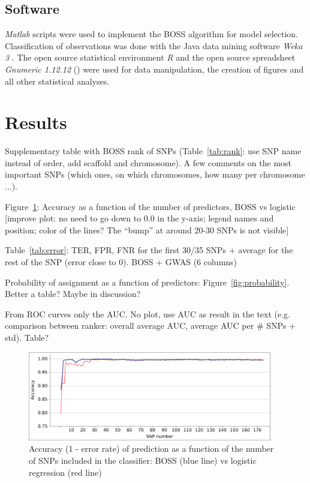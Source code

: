 \subsection{Software}
\label{sec:software}
\emph{Matlab} scripts \cite{MATLAB2010} were used to implement the BOSS
algorithm for model selection. Classification of observations was done
with the Java data mining software \emph{Weka 3} \cite{hall2009weka}.
The open source statistical environment \emph{R} \cite{r2008manual} and
the open source spreadsheet \emph{Gnumeric 1.12.12}
(\cite{gnumeric2014}) were used for data manipulation, the creation of
figures and all other statistical analyses.

\section{Results}
\label{sec:results}
Supplementary table with BOSS rank of SNPs (Table~\ref{tab:rank}: use
SNP name instead of order, add scaffold and chromosome). A few comments on the most
important SNPs (which ones, on which chromosomes, how many per
chromosome ...).

Figure~\ref{fig:accuracy}: Accuracy as a function of the number of
predictors, BOSS vs logistic [improve plot: no need to go down to 0.0 in
the y-axis; legend names and position; color of the lines? The ``bump''
at around 20-30 SNPs is not visible]

Table~\ref{tab:error}: TER, FPR, FNR for the first 30/35 SNPs + average for the
rest of the SNP (error close to $0$). BOSS + GWAS (6 columns)


Probability of assignment as a function of predictors:
Figure~\ref{fig:probability}. Better a table? Maybe in discussion?

From ROC curves only the AUC. No plot, use AUC as result in the text (e.g.
comparison between ranker: overall average AUC, average AUC per \# SNPs
+ std). Table?

\begin{figure}
\includegraphics[width=0.95\textwidth]{accuracy.pdf}
\caption{Accuracy (1 - error rate) of prediction as a function of the
  number of SNPs included in the classifier: BOSS (blue line) vs
  logistic regression (red line)}
\label{fig:accuracy}       %
\end{figure}

